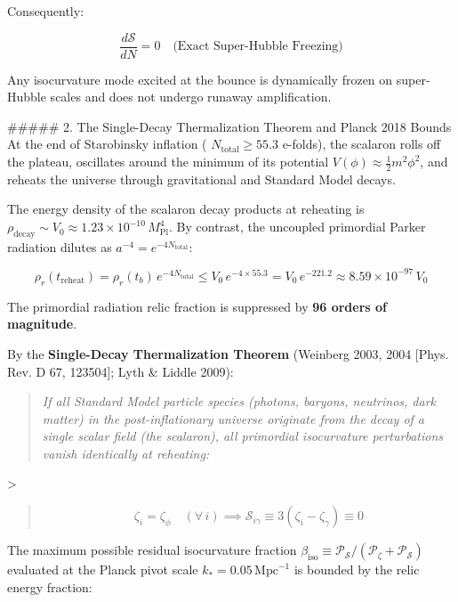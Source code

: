\documentclass[11pt,a4paper]{article}
\theoremstyle{definition}
\theoremstyle{remark}
\begin{document}
Consequently:


\begin{equation}
\frac{d\mathcal{S}}{dN} = 0 \quad \text{(Exact Super-Hubble Freezing)}
\end{equation}


Any isocurvature mode excited at the bounce is dynamically frozen on super-Hubble scales and does not undergo runaway amplification.

\#\#\#\#\# 2. The Single-Decay Thermalization Theorem and Planck 2018 Bounds
At the end of Starobinsky inflation ( $N_{\text{total}} \ge 55.3$ e-folds), the scalaron rolls off the plateau, oscillates around the minimum of its potential $V(\phi) \approx \frac{1}{2} m^2 \phi^2$, and reheats the universe through gravitational and Standard Model decays.

The energy density of the scalaron decay products at reheating is $\rho_{\text{decay}} \sim V_0 \approx 1.23 \times 10^{-10} \, M_{\text{Pl}}^4$. By contrast, the uncoupled primordial Parker radiation dilutes as $a^{-4} = e^{-4 N_{\text{total}}}$:


\begin{equation}
\rho_r(t_{\text{reheat}}) = \rho_r(t_b) \, e^{-4 N_{\text{total}}} \le V_0 \, e^{-4 \times 55.3} = V_0 \, e^{-221.2} \approx 8.59 \times 10^{-97} \, V_0
\end{equation}


The primordial radiation relic fraction is suppressed by \textbf{96 orders of magnitude}.

By the \textbf{Single-Decay Thermalization Theorem} (Weinberg 2003, 2004 [Phys. Rev. D 67, 123504]; Lyth \& Liddle 2009):
\begin{quote}\textit{If all Standard Model particle species (photons, baryons, neutrinos, dark matter) in the post-inflationary universe originate from the decay of a single scalar field (the scalaron), all primordial isocurvature perturbations vanish identically at reheating:}\end{quote}
>
\begin{quote}
\begin{equation}
\zeta_i = \zeta_\phi \quad (\forall \, i) \implies \mathcal{S}_{i\gamma} \equiv 3(\zeta_i - \zeta_\gamma) \equiv 0
\end{equation}
\end{quote}

The maximum possible residual isocurvature fraction $\beta_{\text{iso}} \equiv \mathcal{P}_{\mathcal{S}} / (\mathcal{P}_\zeta + \mathcal{P}_{\mathcal{S}})$ evaluated at the Planck pivot scale $k_* = 0.05 \, \text{Mpc}^{-1}$ is bounded by the relic energy fraction:
\end{document}
